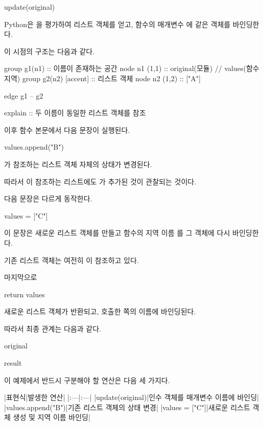 \begin{dhkcode}
update(original)
\end{dhkcode}

Python은 을 평가하여 리스트 객체를 얻고, 함수의 매개변수 에 같은 객체를 바인딩한다.

이 시점의 구조는 다음과 같다.

\begin{dhkgraph}[uniform]
group g1(n1) :: 이름이 존재하는 공간
node n1 (1,1) :: original(모듈) // values(함수 지역)
group g2(n2) [accent] :: 리스트 객체
node n2 (1,2) :: ["A"]

edge g1 -- g2

explain :: 두 이름이 동일한 리스트 객체를 참조
\end{dhkgraph}

이후 함수 본문에서 다음 문장이 실행된다.

\begin{dhkcode}
values.append("B")
\end{dhkcode}

가 참조하는 리스트 객체 자체의 상태가 변경된다.

따라서 이 참조하는 리스트에도 가 추가된 것이 관찰되는 것이다.

다음 문장은 다르게 동작한다.

\begin{dhkcode}
values = ["C"]
\end{dhkcode}

이 문장은 새로운 리스트 객체를 만들고 함수의 지역 이름 를 그 객체에 다시 바인딩한다.

기존 리스트 객체는 여전히 이 참조하고 있다.

마지막으로

\begin{dhkcode}
return values
\end{dhkcode}

새로운 리스트 객체가 반환되고, 호출한 쪽의  이름에 바인딩된다.

따라서 최종 관계는 다음과 같다.

\begin{dhksmry}
    original \ra ["A", "B"]

    result \ra ["C"]
\end{dhksmry}

이 예제에서 반드시 구분해야 할 연산은 다음 세 가지다.

\begin{dhktable}
|표현식|발생한 연산|
|:---|:---|
|update(original)|인수 객체를 매개변수 이름에 바인딩|
|values.append("B")|기존 리스트 객체의 상태 변경|
|values = ["C"]|새로운 리스트 객체 생성 및 지역 이름 바인딩|
\end{dhktable}

